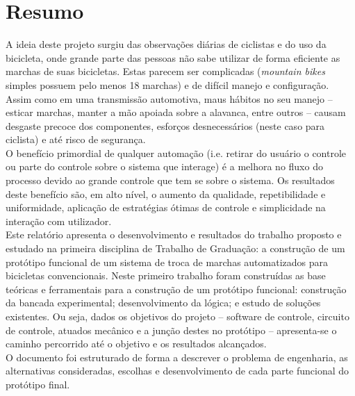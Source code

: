 \documentclass[a4paper,11pt]{article}
\begin{document}



%
\section{Resumo}
\label{sec:resumo}
A ideia deste projeto surgiu das observações diárias de ciclistas e do uso
da bicicleta, onde grande parte das pessoas não sabe utilizar de
forma eficiente as marchas de suas bicicletas. Estas parecem ser
complicadas (\textit{mountain bikes} simples possuem pelo menos 18 marchas) e de
difícil manejo e configuração. Assim como em uma transmissão automotiva, maus
hábitos no seu manejo -- esticar marchas, manter a mão apoiada sobre a alavanca,
entre outros -- causam desgaste precoce dos componentes, esforços desnecessários
(neste caso para ciclista) e até risco de segurança.
\\
O benefício primordial de qualquer automação (i.e. retirar do usuário o
controle ou parte do controle sobre o sistema que interage) é a melhora no
fluxo do processo devido ao grande controle que tem se sobre o sistema. Os
resultados deste benefício são, em alto nível, o aumento da qualidade,
repetibilidade e uniformidade, aplicação de estratégias ótimas de controle e
simplicidade na interação com utilizador.
\\
Este relatório apresenta o desenvolvimento e resultados do trabalho proposto e
estudado na primeira disciplina de Trabalho de Graduação: a construção de um
protótipo funcional de um sistema de troca de marchas automatizados para
bicicletas convencionais. Neste primeiro trabalho foram construídas as base
teóricas e ferramentais para a construção de um protótipo funcional: construção
da bancada experimental; desenvolvimento da lógica; e estudo de soluções 
existentes. Ou seja, dados os objetivos do projeto -- software de controle,
circuito de controle, atuados mecânico e a junção destes no protótipo --
apresenta-se o caminho percorrido até o objetivo e os resultados alcançados.
\\
O documento foi estruturado de forma a descrever o problema de engenharia, as
alternativas consideradas, escolhas e desenvolvimento de cada parte funcional do
protótipo final.
\end{document}
